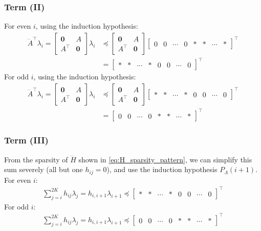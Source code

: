 \documentclass[a4paper,12pt]{article}
\theoremstyle{definition}
\begin{document}
\subsubsection{Term (II)}
For even $i$, using the induction hypothesis:
\begin{align}
    \dddot{A}^\top \lambda_i = \begin{bmatrix} \mathbf{0} & A \\ A^\top & \mathbf{0} \end{bmatrix} \lambda_i &\preceq \begin{bmatrix} \mathbf{0} & A \\ A^\top & \mathbf{0} \end{bmatrix} \begin{bmatrix} 0 & 0 & \cdots & 0 & * & * & \cdots & *\end{bmatrix} ^\top 
    \\
    &= \begin{bmatrix} * & * & \cdots &  * & 0 & 0 &\cdots & 0\end{bmatrix} ^\top
\end{align}
For odd $i$, using the induction hypothesis:
\begin{align}
    \dddot{A}^\top \lambda_i = \begin{bmatrix} \mathbf{0} & A \\ A^\top & \mathbf{0} \end{bmatrix} \lambda_i &\preceq \begin{bmatrix} \mathbf{0} & A \\ A^\top & \mathbf{0} \end{bmatrix} \begin{bmatrix} * & * & \cdots &  * & 0 & 0 &\cdots & 0\end{bmatrix} ^\top
    \\
    &= \begin{bmatrix} 0 & 0 & \cdots & 0 & * & * & \cdots & *\end{bmatrix} ^\top 
\end{align} 
\subsubsection{Term (III)}
From the sparsity of $\dddot{H}$ shown in \eqref{eq:H_sparsity_pattern}, we can simplify this sum severely (all but one $h_{ij} = 0$), and use the induction hypothesis $P_\Lambda(i+1)$. For even $i$: 
\begin{align}
    \sum_{j=i}^{2K} h_{ij} \lambda_j =  h_{i,i+1} \lambda_{i+1} \preceq  \begin{bmatrix} * & * & \cdots &  * & 0 & 0 &\cdots & 0\end{bmatrix} ^\top
\end{align}
For odd $i$: 
\begin{align}
    \sum_{j=i}^{2K} h_{ij} \lambda_j =  h_{i,i+1} \lambda_{i+1} \preceq  \begin{bmatrix} 0 & 0 & \cdots &  0 & * & * &\cdots & *\end{bmatrix} ^\top
\end{align}
\end{document}
